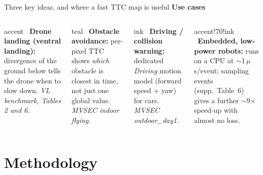 \documentclass[aspectratio=169,10pt]{beamer}
\newcommand{\us}{\,$\mu$s}
\newcommand{\sectag}{}
\newcommand{\settag}[1]{\renewcommand{\sectag}{#1}}
\begin{document}
\begin{frame}{Three key ideas, and where a fast TTC map is useful}
  \vspace{-1mm}
  {\color{titlebar}\bfseries Use cases}\par\vspace{-3mm}
  \begin{columns}[T,onlytextwidth]
    \begin{card}[equal height group=uses1,fontupper=\footnotesize\raggedright,after skip=1.5mm]{accent}
      \faHelicopter\ \textbf{Drone landing (ventral landing):}
      divergence of the ground below tells the drone when to slow down.
      \emph{VL benchmark, Tables 2 and 6.}
    \end{card}
    \begin{card}[equal height group=uses2,fontupper=\footnotesize\raggedright,before skip=0pt]{teal}
      \faPlane\ \textbf{Obstacle avoidance:}
      per-pixel TTC shows \emph{which} obstacle is closest in time, not just one global value.
      \emph{MVSEC indoor flying.}
    \end{card}
    \begin{card}[equal height group=uses1,fontupper=\footnotesize\raggedright,after skip=1.5mm]{ink}
      \faCar\ \textbf{Driving / collision warning:}
      dedicated \emph{Driving} motion model (forward speed + yaw) for cars.
      \emph{MVSEC outdoor\_day1.}
    \end{card}
    \begin{card}[equal height group=uses2,fontupper=\footnotesize\raggedright,before skip=0pt]{accent!70!ink}
      \faMicrochip\ \textbf{Embedded, low-power robots:}
      runs on a CPU at $\sim$1\us/event; sampling events (supp.\ Table~6) gives a further
      $\sim$9$\times$ speed-up with almost no loss.
    \end{card}
  \end{columns}
\end{frame}

\section{Methodology}
\settag{4\enspace Methodology}
\end{document}
